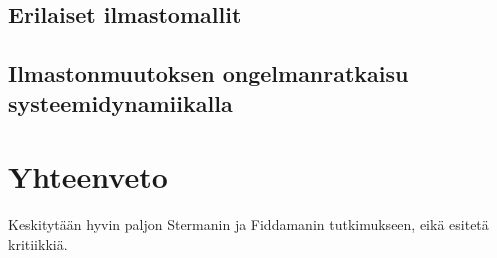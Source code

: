 \documentclass[finnish,12pt,a4paper,pdftex]{article}
\begin{document}
\begin{onehalfspacing}
\subsection{Erilaiset ilmastomallit \label{ilmasto:muut}}

\subsection{Ilmastonmuutoksen ongelmanratkaisu systeemidynamiikalla \label{ilmasto:ongelmanratkaisu}}


\clearpage




\section{Yhteenveto \label{yhteenveto}}

Keskitytään hyvin paljon Stermanin ja Fiddamanin tutkimukseen, eikä esitetä kritiikkiä. 

\clearpage
{}
%
%
\printbibliography

\end{onehalfspacing} %
\end{document}
